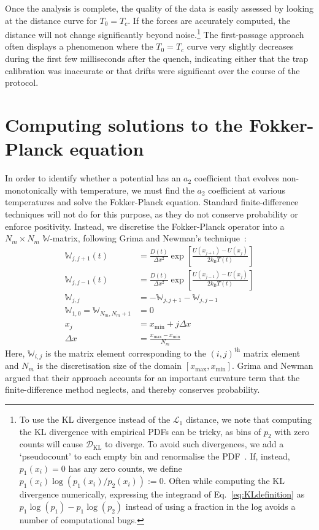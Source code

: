 \documentclass[hyperref={colorlinks=true, urlcolor=blue, citecolor=blue, final, bound}]{sfuthesis}
\newcommand{\kB}{k_{\mathrm{B}}}
\begin{document}
Once the analysis is complete, the quality of the data is easily assessed by looking at the distance curve for $T_0=T_c$. If the forces are accurately computed, the distance will not change significantly beyond noise.\footnote{To use the KL divergence instead of the $\mathcal L_1$ distance, we note that computing the KL divergence with empirical PDFs can be tricky, as bins of $p_2$ with zero counts will cause $\mathscr D_{\mathrm{KL}}$ to diverge. To avoid such divergences, we add a `pseudocount' to each empty bin and renormalise the PDF~\cite[Sec.~3.6]{Jurafsky2009}. If, instead, $p_1(x_i)=0$ has any zero counts, we define $p_1(x_i)\log(p_1(x_i)/p_2(x_i)):=0$. Often while computing the KL divergence numerically, expressing the integrand of Eq.~\ref{eq:KLdefinition} as $p_1\log(p_1)-p_1\log(p_2)$ instead of using a fraction in the log avoids a number of computational bugs.} The first-passage approach often displays a phenomenon where the $T_0=T_c$ curve very slightly decreases during the first few milliseconds after the quench, indicating either that the trap calibration was inaccurate or that drifts were significant over the course of the protocol.


\section{Computing solutions to the Fokker-Planck equation}
In order to identify whether a potential has an $a_2$ coefficient that evolves non-monotonically with temperature, we must find the $a_2$ coefficient at various temperatures and solve the Fokker-Planck equation. Standard finite-difference techniques will not do for this purpose, as they do not conserve probability or enforce positivity. Instead, we discretise the Fokker-Planck operator into a $N_m\times N_m$ $\mathbb W$-matrix, following Grima and Newman's technique~\cite{Grima2004}: 
\begin{align}
    \mathbb W_{j,j+1}(t) &= \frac{D(t)}{\Delta x^2}\exp[\frac{U(x_{j+1})-U(x_j)}{2\kB T(t)}]\\
    \mathbb W_{j,j-1}(t) &= \frac{D(t)}{\Delta x^2}\exp[\frac{U(x_{j-1})-U(x_j)}{2\kB T(t)}]\\
    \mathbb W_{j,j} &= -\mathbb W_{j,j+1}-\mathbb W_{j,j-1}\\
    \mathbb W_{1,0} = \mathbb W_{N_m,N_m+1} &= 0\\
    x_j &= x_{\min}+j\Delta x\\
    \Delta x &= \frac{x_{\max}-x_{\min}}{N_m}\label{eq:GrimaNewman}
\end{align}
Here, $\mathbb W_{i,j}$ is the matrix element corresponding to the $(i,j)^{\mathrm{th}}$ matrix element and $N_m$ is the discretisation size of the domain $[x_{\max}, x_{\min}]$. Grima and Newman argued that their approach accounts for an important curvature term that the finite-difference method neglects, and thereby conserves probability. 
\end{document}
